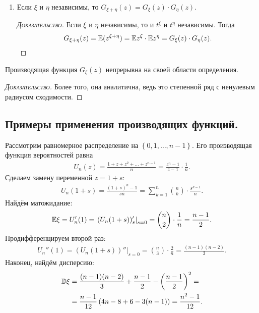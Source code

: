 \documentclass[../main.tex]{subfiles}
\begin{document}
\begin{prop}
\begin{enumerate}
\begin{proof}[\normalfont\textsc{Доказательство}]
\begin{align*}
     \D\xi &= \E\xi^{2} - (\E\xi)^{2} = G_\xi''(1) + G_\xi'(1) - G_\xi'(1)^{2}.
    \end{align*}
   \end{proof}
  \item Если $ \xi $ и $ \eta $ независимы, то $ G_{\xi + \eta}(z) = G_{\xi}(z) \cdot G_\eta(z) $.
   \begin{proof}[\normalfont\textsc{Доказательство}]
    Если $ \xi $ и $ \eta $ независимы, то и $ t^{\xi}  $ и $ t^{\eta} $ независимы. Тогда
    \begin{align*}
     G_{\xi+\eta}(z) = \mathbb E(z^{\xi+\eta}) = \mathbb E z^{\xi} \cdot \mathbb E z^{\eta} = G_\xi(z) \cdot G_\eta(z).
    \end{align*}
   \end{proof}
 \end{enumerate}
\end{prop}

\begin{prop}
 Производящая функция $ G_\xi(z) $ непрерывна на своей области определения.
\end{prop}
\begin{proof}[\normalfont\textsc{Доказательство}]
 Более того, она аналитична, ведь это степенной ряд с ненулевым радиусом сходимости.
\end{proof}

\subsection{Примеры применения производящих функций.}

\begin{exmpl}
 Рассмотрим равномерное распределение на $  \left\{ 0,1,\ldots,n-1 \right\} $. Его производящая функция вероятностей равна
 \begin{align*}
  U_n(z) = \frac{1 + z + z^{2} + \ldots + z^{n-1}}{n} = \frac{z^{n}-1}{z-1} \cdot \frac{1}{n}.
 \end{align*} Сделаем замену переменной $ z = 1 + s $:
 \begin{align*}
  U_n(1 + s) = \frac{(1+s)^{n} - 1}{sn} = \sum_{k=1}^{n} \binom n k  \cdot \frac{s^{k-1}}{n}.
 \end{align*} Найдём матожидание:
 \begin{align*}
  \mathbb E \xi = U'_n(1) = \left.(U_n(1 + s))'_s\right|_{s=0} = \binom n 2 \cdot \frac{1}{n} = \frac{n-1}{2}.
  \end{align*} Продифференцируем второй раз:
  \begin{align*}
   U_n''(1) = \left.(U_n(1 + s))''\right|_{s=0} = \binom n 3 \cdot \frac{2}{n} = \frac{(n-1)(n-2)}{3}.
   \end{align*} Наконец, найдём дисперсию:
   \begin{align*}
    \mathbb D \xi &= \frac{(n-1)(n-2)}{3} + \frac{n-1}{2} - \left( \frac{n-1}{2} \right)^{2} = \\
    &= \frac{n - 1}{12} \left( 4n - 8 + 6 - 3(n - 1) \right) = \frac{n^{2}-1}{12}.
   \end{align*}
  \end{exmpl}
\end{document}
